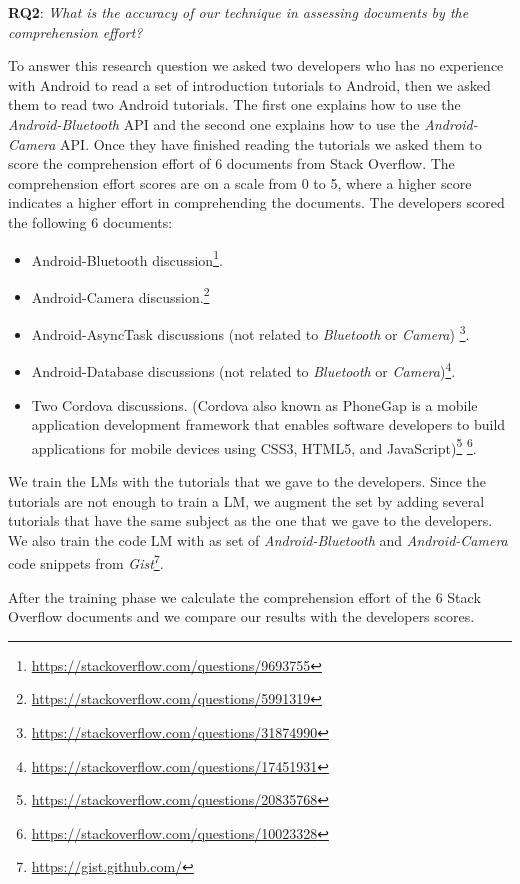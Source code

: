 \documentclass[12pt,mscthesis]{usiinfthesis}
\begin{document}
		{\textbf{RQ2}: \emph{What is the accuracy of our technique in assessing documents by the comprehension effort?}


		To answer this research question we asked two developers who has no experience with Android to read a set of introduction tutorials to Android, then we asked them to read two Android tutorials. The first one explains how to use the \emph{Android-Bluetooth} API and the second one explains how to use the \emph{Android-Camera} API. Once they have finished reading the tutorials we asked them to score the comprehension effort of 6 documents from Stack Overflow. The comprehension effort scores are on a scale from 0 to 5, where a higher score indicates a higher effort in comprehending the documents. The developers scored the following 6 documents:

		\begin{itemize}
			\item   Android-Bluetooth discussion\footnote{\url{https://stackoverflow.com/questions/9693755}}.
			\item   Android-Camera discussion.\footnote{\url{https://stackoverflow.com/questions/5991319}}
			\item   Android-AsyncTask discussions (not related to \emph{Bluetooth} or \emph{Camera}) \footnote{\url{https://stackoverflow.com/questions/31874990}}.
			\item   Android-Database discussions (not related to \emph{Bluetooth} or \emph{Camera})\footnote{\url{https://stackoverflow.com/questions/17451931}}.
			\item   Two Cordova discussions. (Cordova also known as PhoneGap is a mobile application development framework that enables software developers to build applications for mobile devices using CSS3, HTML5, and JavaScript)\footnote{\url{https://stackoverflow.com/questions/20835768}} \footnote{\url{https://stackoverflow.com/questions/10023328}}.
		\end{itemize}

		We train the LMs with the tutorials that we gave to the developers. Since the tutorials are not enough to train a LM, we augment the set by adding several tutorials that have the same subject as the one that we gave to the developers. We also train the code LM with as set of \emph{Android-Bluetooth} and \emph{Android-Camera} code snippets from \emph{Gist}\footnote{\url{https://gist.github.com/}}.


		 After the training phase we calculate the comprehension effort of the 6 Stack Overflow documents and we compare our results with the developers scores.



}
\end{document}

